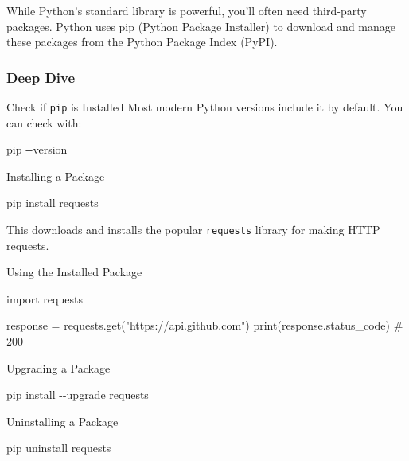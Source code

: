 \documentclass[
  letterpaper,
  DIV=11,
  numbers=noendperiod]{scrreprt}
\newenvironment{Shaded}{\begin{snugshade}}{\end{snugshade}}
\newcommand{\AttributeTok}[1]{\textcolor[rgb]{0.40,0.45,0.13}{#1}}
\newcommand{\BuiltInTok}[1]{\textcolor[rgb]{0.00,0.23,0.31}{#1}}
\newcommand{\CommentTok}[1]{\textcolor[rgb]{0.37,0.37,0.37}{#1}}
\newcommand{\ExtensionTok}[1]{\textcolor[rgb]{0.00,0.23,0.31}{#1}}
\newcommand{\ImportTok}[1]{\textcolor[rgb]{0.00,0.46,0.62}{#1}}
\newcommand{\NormalTok}[1]{\textcolor[rgb]{0.00,0.23,0.31}{#1}}
\newcommand{\OperatorTok}[1]{\textcolor[rgb]{0.37,0.37,0.37}{#1}}
\newcommand{\StringTok}[1]{\textcolor[rgb]{0.13,0.47,0.30}{#1}}
\begin{document}
While Python's standard library is powerful, you'll often need
third-party packages. Python uses pip (Python Package Installer) to
download and manage these packages from the Python Package Index (PyPI).

\subsubsection{Deep Dive}\label{deep-dive-47}

Check if \texttt{pip} is Installed Most modern Python versions include
it by default. You can check with:

\begin{Shaded}
\begin{Highlighting}[]
\ExtensionTok{pip} \AttributeTok{{-}{-}version}
\end{Highlighting}
\end{Shaded}

Installing a Package

\begin{Shaded}
\begin{Highlighting}[]
\ExtensionTok{pip}\NormalTok{ install requests}
\end{Highlighting}
\end{Shaded}

This downloads and installs the popular \texttt{requests} library for
making HTTP requests.

Using the Installed Package

\begin{Shaded}
\begin{Highlighting}[]
\ImportTok{import}\NormalTok{ requests}

\NormalTok{response }\OperatorTok{=}\NormalTok{ requests.get(}\StringTok{"https://api.github.com"}\NormalTok{)}
\BuiltInTok{print}\NormalTok{(response.status\_code)   }\CommentTok{\# 200}
\end{Highlighting}
\end{Shaded}

Upgrading a Package

\begin{Shaded}
\begin{Highlighting}[]
\ExtensionTok{pip}\NormalTok{ install }\AttributeTok{{-}{-}upgrade}\NormalTok{ requests}
\end{Highlighting}
\end{Shaded}

Uninstalling a Package

\begin{Shaded}
\begin{Highlighting}[]
\ExtensionTok{pip}\NormalTok{ uninstall requests}
\end{Highlighting}
\end{Shaded}
\end{document}
